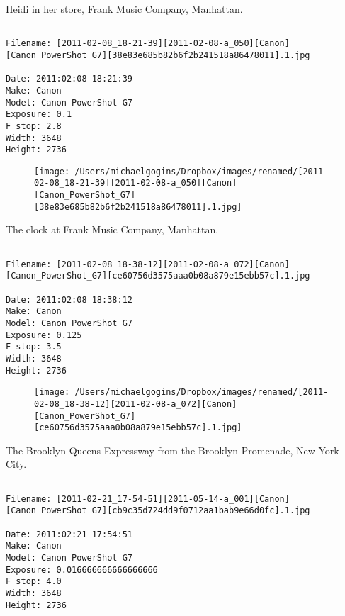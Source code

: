 \clearpage
\onecolumn
\noindent Heidi in her store, Frank Music Company, Manhattan.
\noindent
\begin{lstlisting}

Filename: [2011-02-08_18-21-39][2011-02-08-a_050][Canon][Canon_PowerShot_G7][38e83e685b82b6f2b241518a86478011].1.jpg

Date: 2011:02:08 18:21:39
Make: Canon
Model: Canon PowerShot G7
Exposure: 0.1
F stop: 2.8
Width: 3648
Height: 2736
\end{lstlisting}
\clearpage

\begin{figure}
\texttt{[image: /Users/michaelgogins/Dropbox/images/renamed/[2011-02-08\_18-21-39][2011-02-08-a\_050][Canon][Canon\_PowerShot\_G7][38e83e685b82b6f2b241518a86478011].1.jpg]}
\end{figure}
    
\clearpage
\onecolumn
\noindent The clock at Frank Music Company, Manhattan.
\noindent
\begin{lstlisting}

Filename: [2011-02-08_18-38-12][2011-02-08-a_072][Canon][Canon_PowerShot_G7][ce60756d3575aaa0b08a879e15ebb57c].1.jpg

Date: 2011:02:08 18:38:12
Make: Canon
Model: Canon PowerShot G7
Exposure: 0.125
F stop: 3.5
Width: 3648
Height: 2736
\end{lstlisting}
\clearpage

\begin{figure}
\texttt{[image: /Users/michaelgogins/Dropbox/images/renamed/[2011-02-08\_18-38-12][2011-02-08-a\_072][Canon][Canon\_PowerShot\_G7][ce60756d3575aaa0b08a879e15ebb57c].1.jpg]}
\end{figure}
    
\clearpage
\onecolumn
\noindent The Brooklyn Queens Expressway from the Brooklyn Promenade, New York City.
\noindent
\begin{lstlisting}

Filename: [2011-02-21_17-54-51][2011-05-14-a_001][Canon][Canon_PowerShot_G7][cb9c35d724dd9f0712aa1bab9e66d0fc].1.jpg

Date: 2011:02:21 17:54:51
Make: Canon
Model: Canon PowerShot G7
Exposure: 0.016666666666666666
F stop: 4.0
Width: 3648
Height: 2736
\end{lstlisting}
\clearpage

